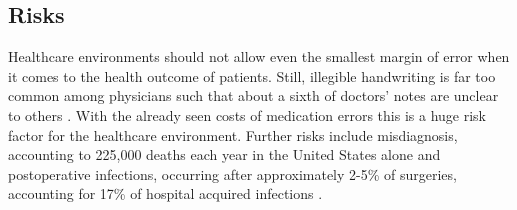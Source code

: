 \subsection{Risks}
Healthcare environments should not allow even the smallest margin of error when it comes to the health outcome of patients. Still, illegible handwriting is far too common among physicians such that about a sixth of doctors' notes are unclear to others \cite{rodriguez2002illegible}. With the already seen costs of medication errors this is a huge risk factor for the healthcare environment. Further risks include misdiagnosis, accounting to 225,000 deaths each year in the United States alone \cite{gregerIatrogenic} and postoperative infections, occurring after approximately 2-5\% of surgeries, accounting for 17\% of hospital acquired infections \cite{andreu2015wearable}.

